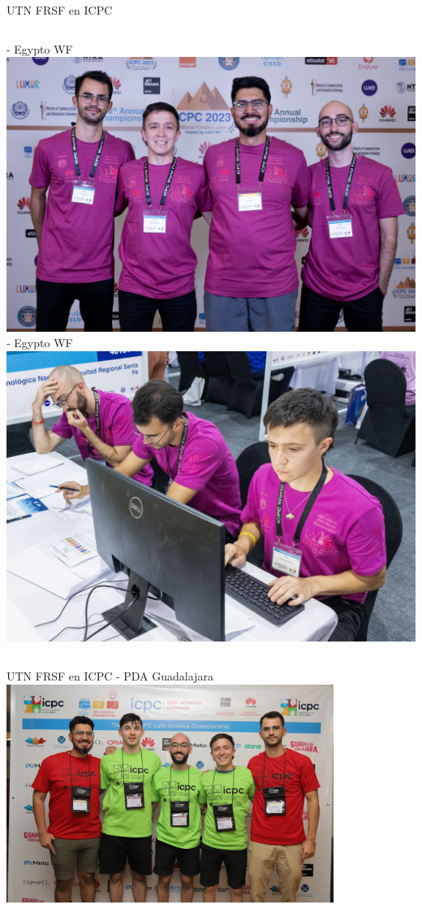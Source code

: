 \documentclass{beamer}
\begin{document}
\begin{frame}{UTN FRSF en ICPC}
    \begin{columns}[t]
         - Egypto WF\\
        \includegraphics[width=1\textwidth]{img/utn_wf_03.jpg}
         - Egypto WF\\
        \includegraphics[width=1\textwidth]{img/utn_wf_04.jpg}
    \end{columns}
\end{frame}

\begin{frame}{UTN FRSF en ICPC}
     - PDA Guadalajara\\
    \includegraphics[width=0.8\textwidth]{img/utn_pda_01.png}
\end{frame}
\end{document}
